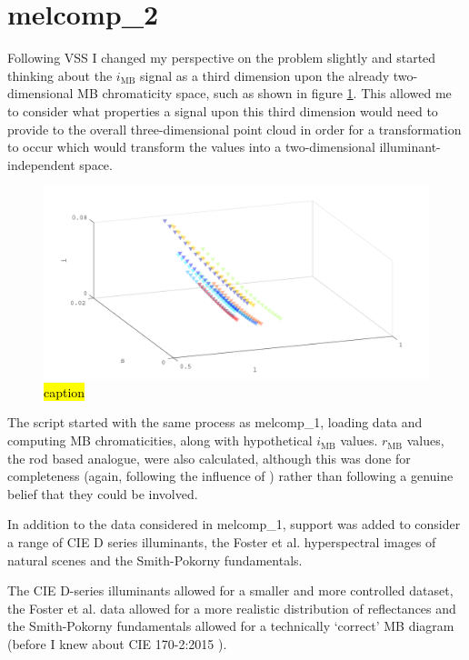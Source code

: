 \section{melcomp\_2}

Following VSS I changed my perspective on the problem slightly and started thinking about the $i_{\text{MB}}$ signal as a third dimension upon the already two-dimensional \gls{MB} chromaticity space, such as shown in figure \ref{fig:ZL}. This allowed me to consider what properties a signal upon this third dimension would need to provide to the overall three-dimensional point cloud in order for a transformation to occur which would transform the values into a two-dimensional illuminant-independent space.

\begin{figure}[htbp]
 \includegraphics[max width=\textwidth]{figs/comp/melcomp_2/ZL.pdf}
 \caption{\hl{caption}}
 \label{fig:ZL}
\end{figure} 

The script started with the same process as melcomp\_1, loading data and computing \gls{MB} chromaticities, along with hypothetical $i_{\text{MB}}$ values. $r_{\text{MB}}$ values, the rod based analogue, were also calculated, although this was done for completeness (again, following the influence of \cite{barrionuevo_contributions_2014}) rather than following a genuine belief that they could be involved.

In addition to the data considered in melcomp\_1, support was added to consider a range of CIE D series illuminants, the Foster et al. hyperspectral images of natural scenes and the Smith-Pokorny fundamentals.

The CIE D-series illuminants allowed for a smaller and more controlled dataset, the Foster et al. data allowed for a more realistic distribution of reflectances and the Smith-Pokorny fundamentals allowed for a technically `correct' \gls{MB} diagram (before I knew about CIE 170-2:2015 \cite{cie_cie_2015}).

